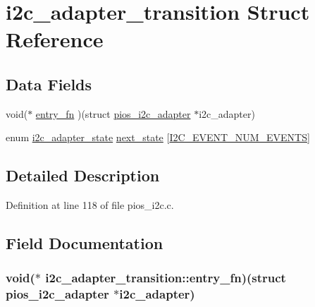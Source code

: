 \hypertarget{structi2c__adapter__transition}{\section{i2c\-\_\-adapter\-\_\-transition \-Struct \-Reference}
\label{structi2c__adapter__transition}
}
\subsection*{\-Data \-Fields}
\begin{DoxyCompactItemize}
\item 
void($\ast$ \hyperlink{structi2c__adapter__transition_ac14dc1e0fd399564ba74506ebef339f9}{entry\-\_\-fn} )(struct \hyperlink{structpios__i2c__adapter}{pios\-\_\-i2c\-\_\-adapter} $\ast$i2c\-\_\-adapter)
\item 
enum \hyperlink{pios__i2c__priv_8h_ac73b69ffe53544057fa2e4751fd9c22b}{i2c\-\_\-adapter\-\_\-state} \hyperlink{structi2c__adapter__transition_aeb924ed73ea6faa20f16115e325c9125}{next\-\_\-state} \mbox{[}\hyperlink{group___p_i_o_s___i2_c_gga2a8f77797f5dbd873514e92d3d043649a0cb4ba8c0e16a415465ec638e89ac7b3}{\-I2\-C\-\_\-\-E\-V\-E\-N\-T\-\_\-\-N\-U\-M\-\_\-\-E\-V\-E\-N\-T\-S}\mbox{]}
\end{DoxyCompactItemize}


\subsection{\-Detailed \-Description}


\-Definition at line 118 of file pios\-\_\-i2c.\-c.



\subsection{\-Field \-Documentation}
\hypertarget{structi2c__adapter__transition_ac14dc1e0fd399564ba74506ebef339f9}{
\subsubsection[{entry\-\_\-fn}]{\setlength{\rightskip}{0pt plus 5cm}void($\ast$ {\bf i2c\-\_\-adapter\-\_\-transition\-::entry\-\_\-fn})(struct {\bf pios\-\_\-i2c\-\_\-adapter} $\ast$i2c\-\_\-adapter)}}\label{structi2c__adapter__transition_ac14dc1e0fd399564ba74506ebef339f9}


